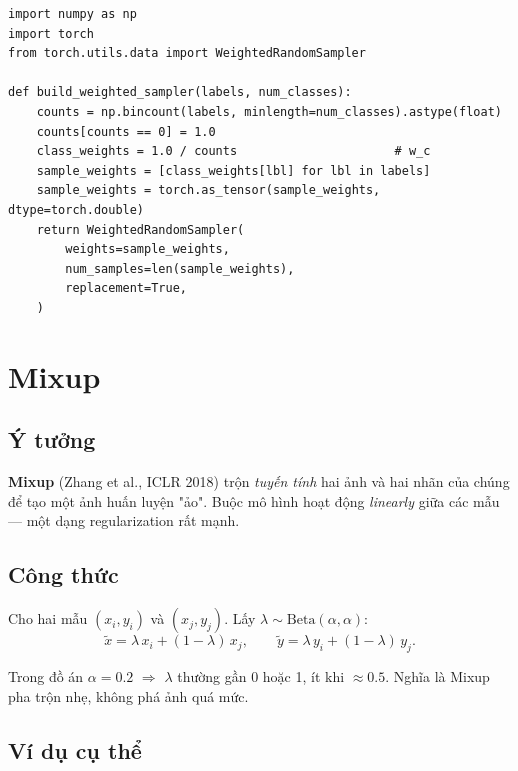 \documentclass[11pt,a4paper]{article}
\begin{document}
\begin{lstlisting}[caption={\texttt{src/data/samplers.py}}]
import numpy as np
import torch
from torch.utils.data import WeightedRandomSampler

def build_weighted_sampler(labels, num_classes):
    counts = np.bincount(labels, minlength=num_classes).astype(float)
    counts[counts == 0] = 1.0
    class_weights = 1.0 / counts                      # w_c
    sample_weights = [class_weights[lbl] for lbl in labels]
    sample_weights = torch.as_tensor(sample_weights, dtype=torch.double)
    return WeightedRandomSampler(
        weights=sample_weights,
        num_samples=len(sample_weights),
        replacement=True,
    )
\end{lstlisting}

\section{Mixup}

\subsection{Ý tưởng}

\textbf{Mixup} (Zhang et al., ICLR 2018) trộn \textit{tuyến tính} hai ảnh và hai nhãn của chúng để tạo một ảnh huấn luyện "ảo". Buộc mô hình hoạt động \textit{linearly} giữa các mẫu --- một dạng regularization rất mạnh.

\subsection{Công thức}

Cho hai mẫu $(x_i, y_i)$ và $(x_j, y_j)$. Lấy $\lambda \sim \mathrm{Beta}(\alpha, \alpha)$:
\[
  \tilde{x} = \lambda \, x_i + (1 - \lambda) \, x_j, \qquad
  \tilde{y} = \lambda \, y_i + (1 - \lambda) \, y_j.
\]

Trong đồ án $\alpha = 0.2$ $\Rightarrow$ $\lambda$ thường gần 0 hoặc 1, ít khi $\approx 0.5$. Nghĩa là Mixup pha trộn nhẹ, không phá ảnh quá mức.

\subsection{Ví dụ cụ thể}
\end{document}
